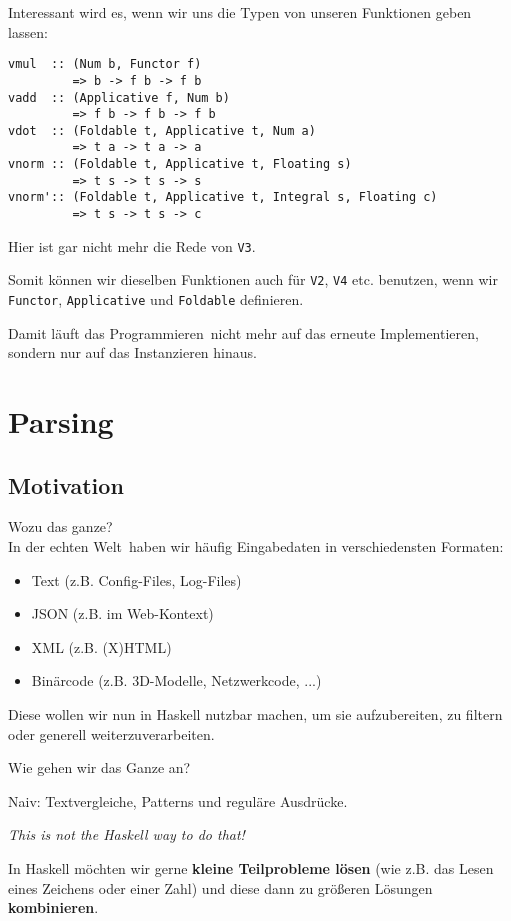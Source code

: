 \documentclass{beamer}
\begin{document}
\begin{frame}[fragile]
Interessant wird es, wenn wir uns die Typen von unseren Funktionen geben lassen:
\begin{verbatim}
vmul  :: (Num b, Functor f)
         => b -> f b -> f b
vadd  :: (Applicative f, Num b)
         => f b -> f b -> f b
vdot  :: (Foldable t, Applicative t, Num a)
         => t a -> t a -> a
vnorm :: (Foldable t, Applicative t, Floating s)
         => t s -> t s -> s
vnorm':: (Foldable t, Applicative t, Integral s, Floating c)
         => t s -> t s -> c
\end{verbatim}
\pause
Hier ist gar nicht mehr die Rede von \texttt{V3}.\par
\pause

Somit können wir dieselben Funktionen auch für \texttt{V2}, \texttt{V4} etc. benutzen, wenn wir \texttt{Functor}, \texttt{Applicative} und \texttt{Foldable} definieren.\par
\pause

Damit läuft das \glqq Programmieren\grqq \ nicht mehr auf das erneute Implementieren, sondern nur auf das Instanzieren hinaus.
\end{frame}


\section{Parsing}

\subsection{Motivation}

\begin{frame}[fragile]
\large Wozu das ganze?\\
\normalsize In der \glqq echten Welt\grqq \ haben wir häufig Eingabedaten in verschiedensten Formaten:
\begin{itemize}
 \item Text (z.B. Config-Files, Log-Files)
 \item JSON (z.B. im Web-Kontext)
 \item XML (z.B. (X)HTML)
 \item Binärcode (z.B. 3D-Modelle, Netzwerkcode, ...)
\end{itemize}
\pause
Diese wollen wir nun in Haskell nutzbar machen, um sie aufzubereiten, zu filtern oder generell weiterzuverarbeiten.
\end{frame}

\begin{frame}[fragile]
\large Wie gehen wir das Ganze an?\smallskip

\normalsize Naiv: Textvergleiche, Patterns und reguläre Ausdrücke.
\bigskip

\pause
\emph{This is not the Haskell way to do that!}\bigskip

\pause
In Haskell möchten wir gerne \textbf{kleine Teilprobleme lösen} (wie z.B. das Lesen eines Zeichens oder einer Zahl) und diese dann zu größeren Lösungen \textbf{kombinieren}.
\end{frame}
\end{document}
